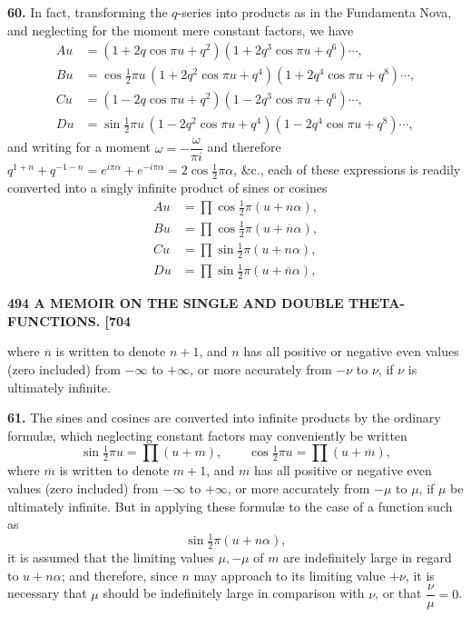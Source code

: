 \documentclass[11pt]{article}
\begin{document}
\medskip
\textbf{60.} In fact, transforming the $q$-series into products as in the Fundamenta Nova, and neglecting for the moment mere constant factors, we have
\[
\begin{aligned}
Au &= (1 + 2q\cos\pi u + q^2)(1 + 2q^3\cos\pi u + q^6)\cdots,\\
Bu &= \cos\tfrac{1}{2}\pi u\,(1 + 2q^2\cos\pi u + q^4)(1 + 2q^4\cos\pi u + q^8)\cdots,\\
Cu &= (1 - 2q\cos\pi u + q^2)(1 - 2q^3\cos\pi u + q^6)\cdots,\\
Du &= \sin\tfrac{1}{2}\pi u\,(1 - 2q^2\cos\pi u + q^4)(1 - 2q^4\cos\pi u + q^8)\cdots,
\end{aligned}
\]
and writing for a moment $\omega = -\dfrac{\omega}{\pi i}$ and therefore $q^{1+n} + q^{-1-n} = e^{i\pi\alpha} + e^{-i\pi\alpha} = 2\cos\tfrac{1}{2}\pi\alpha$, \&c., each of these expressions is readily converted into a singly infinite product of sines or cosines
\[
\begin{aligned}
Au &= \prod\cos\tfrac{1}{2}\pi(u+n\alpha),\\
Bu &= \prod\cos\tfrac{1}{2}\pi(u+\overline{n}\alpha),\\
Cu &= \prod\sin\tfrac{1}{2}\pi(u+n\alpha),\\
Du &= \prod\sin\tfrac{1}{2}\pi(u+\overline{n}\alpha),
\end{aligned}
\]

\bigskip
\noindent\textbf{494 \hfill A MEMOIR ON THE SINGLE AND DOUBLE THETA-FUNCTIONS. \hfill [704}

\medskip
where $\overline{n}$ is written to denote $n+1$, and $n$ has all positive or negative even values (zero included) from $-\infty$ to $+\infty$, or more accurately from $-\nu$ to $\nu$, if $\nu$ is ultimately infinite.

\medskip
\textbf{61.} The sines and cosines are converted into infinite products by the ordinary formul\ae, which neglecting constant factors may conveniently be written
\[
\sin\tfrac{1}{2}\pi u = \prod(u+m),\qquad \cos\tfrac{1}{2}\pi u = \prod(u+\overline{m}),
\]
where $\overline{m}$ is written to denote $m+1$, and $m$ has all positive or negative even values (zero included) from $-\infty$ to $+\infty$, or more accurately from $-\mu$ to $\mu$, if $\mu$ be ultimately infinite. But in applying these formul\ae{} to the case of a function such as
\[
\sin\tfrac{1}{2}\pi(u+n\alpha),
\]
it is assumed that the limiting values $\mu,-\mu$ of $m$ are indefinitely large in regard to $u+n\alpha$; and therefore, since $n$ may approach to its limiting value $+\nu$, it is necessary that $\mu$ should be indefinitely large in comparison with $\nu$, or that $\dfrac{\nu}{\mu}=0$.
\end{document}
